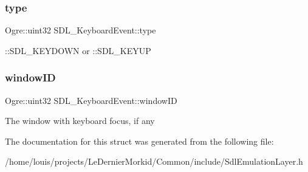 \subsubsection{\texorpdfstring{type}{type}}
{\footnotesize\ttfamily Ogre\+::uint32 S\+D\+L\+\_\+\+Keyboard\+Event\+::type}

\+::\+S\+D\+L\+\_\+\+K\+E\+Y\+D\+O\+WN or \+::\+S\+D\+L\+\_\+\+K\+E\+Y\+UP \mbox{\label{struct_s_d_l___keyboard_event_a1f39f22a6dc08d06ddc21ceff061a289}} 
\subsubsection{\texorpdfstring{window\+ID}{windowID}}
{\footnotesize\ttfamily Ogre\+::uint32 S\+D\+L\+\_\+\+Keyboard\+Event\+::window\+ID}

The window with keyboard focus, if any 

The documentation for this struct was generated from the following file\+:\begin{DoxyCompactItemize}
\item 
/home/louis/projects/\+Le\+Dernier\+Morkid/\+Common/include/Sdl\+Emulation\+Layer.\+h\end{DoxyCompactItemize}
